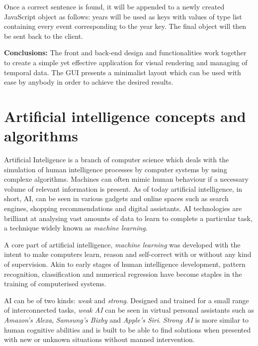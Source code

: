 \documentclass{report}
\begin{document}
Once a correct sentence is found, it will be appended to a newly created JavaScript object as follows: years will be used as keys with values of type list containing every event corresponding to the year key. The final object will then be sent back to the client.\par

\textbf{Conclusions:} The front and back-end design and functionalities work together to create a simple yet effective application for visual rendering and managing of temporal data. The GUI presents a minimalist layout which can be used with ease by anybody in order to achieve the desired results.

\newpage

\chapter {Artificial intelligence concepts and algorithms}

Artificial Inteligence is a branch of computer science which deals with the simulation of human intelligence processes by computer systems by using complexe algorithms. Machines can often mimic human behaviour if a necessary volume of relevant information is present. As of today artificial intelligence, in short, AI, can be seen in various gadgets and online spaces such as search engines, shopping recommendations and digital assistants. AI technologies are brilliant at analysing vast amounts of data to learn to complete a particular task, a technique widely known as \textit{machine learning}. \par

A core part of artificial intelligence, \textit{machine learning} was developed with the intent to make computers learn, reason and self-correct with or without any kind of supervision. Akin to early stages of human intelligence development, pattern recognition, classification and numerical regression have become staples in the training of computerised systems. \par

AI can be of two kinds: \textit{weak} and \textit{strong}. Designed and trained for a small range of interconnected tasks, \textit{weak AI} can be seen in virtual personal assistants such as \textit{Amazon's Alexa}, \textit{Samsung's Bixby} and \textit{Apple's Siri}. \textit{Strong AI} is more similar to human cognitive abilities and is built to be able to find solutions when presented with new or unknown situations without manned intervention.\par
\end{document}

